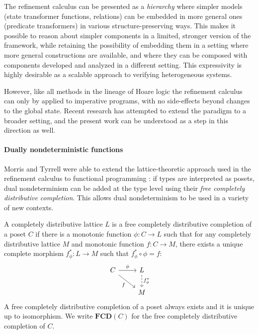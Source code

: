 \documentclass[sigplan,screen]{acmart}
\begin{document}
The refinement calculus can be presented as a \emph{hierarchy}
where simpler models (state transformer functions, relations)
can be embedded in more general ones (predicate transformers)
in various structure-preserving ways.
This makes it possible to reason about simpler components
in a limited, stronger version of the framework,
while retaining the possibility of embedding them
in a setting
where more general constructions are available,
and where they can be composed with components
developed and analyzed in a different setting.
This expressivity is highly desirable
as a scalable approach to
verifying heterogeneous systems.

However,
like all methods in the lineage of Hoare logic
the refinement calculus can only by applied to imperative programs,
with no side-effects beyond changes to the global state.
Recent research has attempted to extend the paradigm
to a broader setting,
and the present work can be understood
as a step in this direction as well.


\paragraph{Dually nondeterministic functions} %

Morris and Tyrrell were able to extend
the lattice-theoretic approach used in the refinement calculus
to functional programming
\cite{augtyp,dndf,cspdnd}:
if types are interpreted as posets,
dual nondeterminism can be added at the type level
using their \emph{free completely distributive completion}.
This allows dual nondeterminism to be used
in a variety of new contexts.

A completely distributive lattice $L$ is a
free completely distributive completion of
a poset $C$ if there is
a monotonic function $\phi : C \rightarrow L$
such that
for any completely distributive lattice $M$
and monotonic function $f : C \rightarrow M$,
there exists a unique complete morphism $f^*_\phi : L \rightarrow M$
such that $f^*_\phi \circ \phi = f$:
\[
  \begin{tikzcd}
    C \arrow[r, "\phi"] \arrow[rd, "f"'] &
    L \arrow[d, "f^*_\phi", dashed] \\ & M
  \end{tikzcd}
\]
A free completely distributive completion of a poset
always exists and it is unique up to isomorphism.
We write $\mathbf{FCD}(C)$ for
the free completely distributive completion of $C$.
\end{document}
